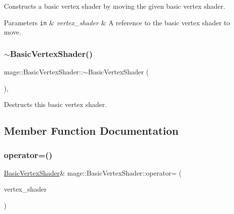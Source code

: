 Constructs a basic vertex shader by moving the given basic vertex shader.


\begin{DoxyParams}[1]{Parameters}
\mbox{\tt in}  & {\em vertex\+\_\+shader} & A reference to the basic vertex shader to move. \\
\hline
\end{DoxyParams}
\hypertarget{classmage_1_1_basic_vertex_shader_ad155c4135f5517667020ec519a3597c9}{}\label{classmage_1_1_basic_vertex_shader_ad155c4135f5517667020ec519a3597c9} 
\subsubsection{\texorpdfstring{$\sim$\+Basic\+Vertex\+Shader()}{~BasicVertexShader()}}
{\footnotesize\ttfamily mage\+::\+Basic\+Vertex\+Shader\+::$\sim$\+Basic\+Vertex\+Shader (\begin{DoxyParamCaption}{ }\end{DoxyParamCaption})\hspace{0.3cm}{\ttfamily [virtual]}, {\ttfamily [default]}}

Destructs this basic vertex shader. 

\subsection{Member Function Documentation}
\hypertarget{classmage_1_1_basic_vertex_shader_ab3d355e76715b24e21fb37c239d41932}{}\label{classmage_1_1_basic_vertex_shader_ab3d355e76715b24e21fb37c239d41932} 
\subsubsection{\texorpdfstring{operator=()}{operator=()}\hspace{0.1cm}{\footnotesize\ttfamily [1/2]}}
{\footnotesize\ttfamily \hyperlink{classmage_1_1_basic_vertex_shader}{Basic\+Vertex\+Shader}\& mage\+::\+Basic\+Vertex\+Shader\+::operator= (\begin{DoxyParamCaption}\item[{const \hyperlink{classmage_1_1_basic_vertex_shader}{Basic\+Vertex\+Shader} \&}]{vertex\+\_\+shader }\end{DoxyParamCaption})\hspace{0.3cm}{\ttfamily [delete]}}

